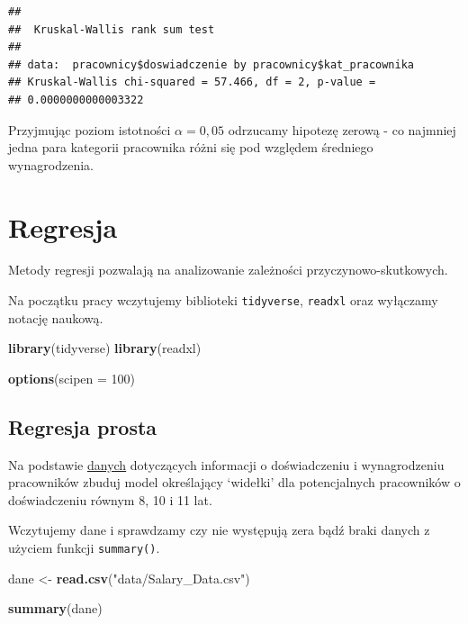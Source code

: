 \documentclass[]{book}
\newenvironment{Shaded}{\begin{snugshade}}{\end{snugshade}}
\newcommand{\DataTypeTok}[1]{\textcolor[rgb]{0.13,0.29,0.53}{#1}}
\newcommand{\DecValTok}[1]{\textcolor[rgb]{0.00,0.00,0.81}{#1}}
\newcommand{\KeywordTok}[1]{\textcolor[rgb]{0.13,0.29,0.53}{\textbf{#1}}}
\newcommand{\NormalTok}[1]{#1}
\newcommand{\StringTok}[1]{\textcolor[rgb]{0.31,0.60,0.02}{#1}}
\begin{document}
\begin{verbatim}
## 
##  Kruskal-Wallis rank sum test
## 
## data:  pracownicy$doswiadczenie by pracownicy$kat_pracownika
## Kruskal-Wallis chi-squared = 57.466, df = 2, p-value =
## 0.0000000000003322
\end{verbatim}

Przyjmując poziom istotności \(\alpha = 0,05\) odrzucamy hipotezę zerową - co najmniej jedna para kategorii pracownika różni się pod względem średniego wynagrodzenia.

\hypertarget{regresja}{%
\chapter{Regresja}\label{regresja}}

Metody regresji pozwalają na analizowanie zależności przyczynowo-skutkowych.

Na początku pracy wczytujemy biblioteki \texttt{tidyverse}, \texttt{readxl} oraz wyłączamy notację naukową.

\begin{Shaded}
\begin{Highlighting}[]
\KeywordTok{library}\NormalTok{(tidyverse)}
\KeywordTok{library}\NormalTok{(readxl)}

\KeywordTok{options}\NormalTok{(}\DataTypeTok{scipen =} \DecValTok{100}\NormalTok{)}
\end{Highlighting}
\end{Shaded}

\hypertarget{regresja-prosta}{%
\section{Regresja prosta}\label{regresja-prosta}}

Na podstawie \href{data/Salary_Data.csv}{danych} dotyczących informacji o doświadczeniu i wynagrodzeniu pracowników zbuduj model określający `widełki' dla potencjalnych pracowników o doświadczeniu równym 8, 10 i 11 lat.

Wczytujemy dane i sprawdzamy czy nie występują zera bądź braki danych z użyciem funkcji \texttt{summary()}.

\begin{Shaded}
\begin{Highlighting}[]
\NormalTok{dane <-}\StringTok{ }\KeywordTok{read.csv}\NormalTok{(}\StringTok{"data/Salary_Data.csv"}\NormalTok{)}

\KeywordTok{summary}\NormalTok{(dane)}
\end{Highlighting}
\end{Shaded}
\end{document}
